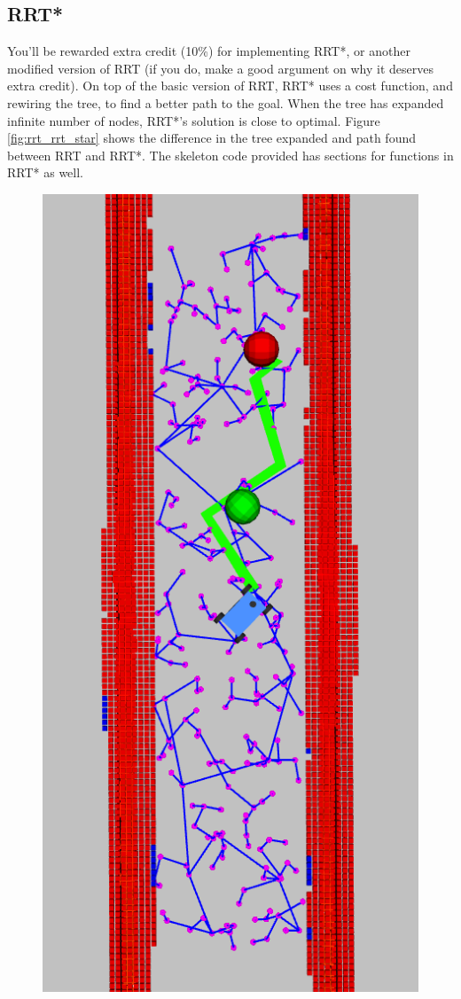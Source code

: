\documentclass[letter]{article}
\begin{document}
\subsection{RRT*}
You'll be rewarded extra credit (10\%) for implementing RRT*, or another modified version of RRT (if you do, make a good argument on why it deserves extra credit). On top of the basic version of RRT, RRT* uses a cost function, and rewiring the tree, to find a better path to the goal. When the tree has expanded infinite number of nodes, RRT*'s solution is close to optimal. Figure \ref{fig:rrt_rrt_star} shows the difference in the tree expanded and path found between RRT and RRT*. The skeleton code provided has sections for functions in RRT* as well.
\begin{figure}[!hb]
    \begin{center}
    \includegraphics[scale=0.35]{rrt.png}

\end{center}
\end{figure}
\end{document}
